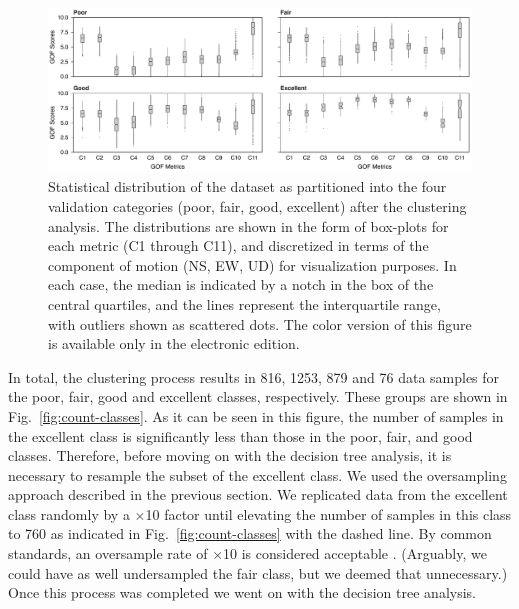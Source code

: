 \begin{figure}
	\centering
	\includegraphics[width=\textwidth]{figures/pdf/figure-06}
	\caption{Statistical distribution of the dataset as partitioned into the four validation categories (poor, fair, good, excellent) after the clustering analysis. The distributions are shown in the form of box-plots for each metric (C1 through C11), and discretized in terms of the component of motion (NS, EW, UD) for visualization purposes. In each case, the median is indicated by a notch in the box of the central quartiles, and the lines represent the interquartile range, with outliers shown as scattered dots. The color version of this figure is available only in the electronic edition.}
	\label{fig:boxed-clusters}
\end{figure}

In total, the clustering process results in 816, 1253, 879 and 76 data samples for the poor, fair, good and excellent classes, respectively. These groups are shown in Fig.~\ref{fig:count-classes}. As it can be seen in this figure, the number of samples in the excellent class is significantly less than those in the poor, fair, and good classes. Therefore, before moving on with the decision tree analysis, it is necessary to resample the subset of the excellent class. We used the oversampling approach described in the previous section. We replicated data from the excellent class randomly by a $\times$10 factor until elevating the number of samples in this class to 760 as indicated in Fig.~\ref{fig:count-classes} with the dashed line. By common standards, an oversample rate of $\times$10 is considered acceptable \citep{Weiss_2003_JAIR}. (Arguably, we could have as well undersampled the fair class, but we deemed that unnecessary.) Once this process was completed we went on with the decision tree analysis. 

